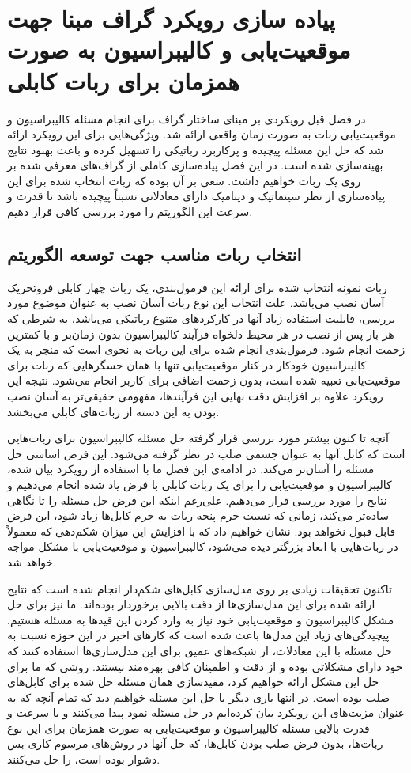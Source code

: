 \chapter{پیاده سازی رویکرد گراف مبنا جهت موقعیت‌یابی و کالیبراسیون به صورت همزمان برای ربات کابلی}

در فصل قبل رویکردی بر مبنای ساختار گراف برای انجام مسئله کالیبراسیون و موقعیت‌یابی ربات به صورت زمان واقعی ارائه شد. ویژگی‌هایی برای این رویکرد ارائه شد که حل این مسئله پیچیده و پرکاربرد رباتیکی را تسهیل کرده و باعث بهبود نتایج بهینه‌سازی شده است. در این فصل پیاده‌سازی کاملی از گراف‌های معرفی شده بر روی یک ربات خواهیم داشت. سعی بر آن بوده که ربات انتخاب شده برای این پیاده‌سازی از نظر سینماتیک و دینامیک دارای معادلاتی نسبتاً پیچیده باشد تا قدرت و سرعت این الگوریتم را مورد بررسی کافی قرار دهیم.


\section{انتخاب ربات مناسب جهت توسعه الگوریتم}

ربات نمونه انتخاب شده برای ارائه این فرمول‌بندی، یک ربات چهار کابلی فروتحریک آسان نصب می‌باشد. علت انتخاب این نوع ربات آسان نصب به عنوان موضوع مورد بررسی، قابلیت استفاده زیاد آنها در کارکردهای متنوع رباتیکی می‌باشد، به شرطی که هر بار پس از نصب در هر محیط دلخواه فرآیند کالیبراسیون بدون زمان‌بر و با کمترین زحمت انجام شود. فرمول‌بندی انجام شده برای این ربات به نحوی است که منجر به یک کالیبراسیون خودکار در کنار موقعیت‌یابی تنها با همان حسگرهایی که ربات برای موقعیت‌یابی تعبیه شده است، بدون زحمت اضافی برای کاربر انجام می‌شود. نتیجه این رویکرد علاوه بر افزایش دقت نهایی این فرآیندها، مفهومی حقیقی‌تر به آسان نصب بودن به این دسته از ربات‌های کابلی می‌بخشد.

آنچه تا کنون بیشتر مورد بررسی قرار گرفته حل مسئله کالیبراسیون برای ربات‌هایی است که کابل آنها به عنوان جسمی صلب در نظر گرفته می‌شود. این فرض اساسی حل مسئله را آسان‌تر می‌کند. در ادامه‌ی این فصل ما با استفاده از رویکرد بیان شده، کالیبراسیون و موقعیت‌یابی را برای یک ربات کابلی با فرض یاد شده انجام می‌دهیم و نتایج را مورد بررسی قرار می‌دهیم. علی‌رغم اینکه این فرض حل مسئله را تا نگاهی ساده‌تر می‌کند، زمانی که نسبت جرم پنجه ربات به جرم کابل‌ها زیاد شود، این فرض قابل قبول نخواهد بود. نشان خواهیم داد که با افزایش این میزان شکم‌دهی که معمولاً در ربات‌هایی با ابعاد بزرگتر دیده می‌شود، کالیبراسیون و موقعیت‌یابی با مشکل مواجه خواهد شد.

تاکنون تحقیقات زیادی بر روی مدل‌سازی کابل‌های شکم‌دار انجام شده است که نتایج ارائه شده برای این مدل‌سازی‌ها از دقت بالایی برخوردار بوده‌اند. ما نیز برای حل مشکل کالیبراسیون و موقعیت‌یابی خود نیاز به وارد کردن این قیدها به مسئله هستیم. پیچیدگی‌های زیاد این مدل‌ها باعث شده است که کارهای اخیر در این حوزه نسبت به حل مسئله با این معادلات، از شبکه‌های عمیق برای این مدل‌سازی‌ها استفاده کنند که خود دارای مشکلاتی بوده و از دقت و اطمینان کافی بهره‌مند نیستند. روشی که ما برای حل این مشکل ارائه خواهیم کرد، مقیدسازی همان مسئله حل شده برای کابل‌های صلب بوده است. در انتها باری دیگر با حل این مسئله خواهیم دید که تمام آنچه که به عنوان مزیت‌های این رویکرد بیان کرده‌ایم در حل مسئله نمود پیدا می‌کنند و با سرعت و قدرت بالایی مسئله کالیبراسیون و موقعیت‌یابی به صورت همزمان برای این نوع ربات‌ها، بدون فرض صلب بودن کابل‌ها، که حل آنها در روش‌های مرسوم کاری بس دشوار بوده است، را حل می‌کنند.


